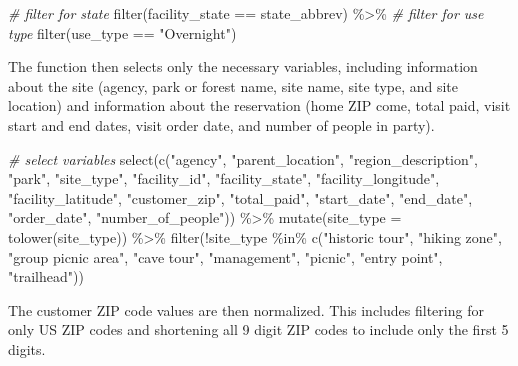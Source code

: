\documentclass[
]{book}
\newenvironment{Shaded}{\begin{snugshade}}{\end{snugshade}}
\newcommand{\AttributeTok}[1]{\textcolor[rgb]{0.77,0.63,0.00}{#1}}
\newcommand{\CommentTok}[1]{\textcolor[rgb]{0.56,0.35,0.01}{\textit{#1}}}
\newcommand{\FunctionTok}[1]{\textcolor[rgb]{0.00,0.00,0.00}{#1}}
\newcommand{\NormalTok}[1]{#1}
\newcommand{\SpecialCharTok}[1]{\textcolor[rgb]{0.00,0.00,0.00}{#1}}
\newcommand{\StringTok}[1]{\textcolor[rgb]{0.31,0.60,0.02}{#1}}
\begin{document}
\begin{Shaded}
\begin{Highlighting}[]
\CommentTok{\# filter for state}
\FunctionTok{filter}\NormalTok{(facility\_state }\SpecialCharTok{==}\NormalTok{ state\_abbrev) }\SpecialCharTok{\%\textgreater{}\%}
  \CommentTok{\# filter for use type}
  \FunctionTok{filter}\NormalTok{(use\_type }\SpecialCharTok{==} \StringTok{"Overnight"}\NormalTok{)}
\end{Highlighting}
\end{Shaded}

The function then selects only the necessary variables, including information about the site (agency, park or forest name, site name, site type, and site location) and information about the reservation (home ZIP come, total paid, visit start and end dates, visit order date, and number of people in party).

\begin{Shaded}
\begin{Highlighting}[]
\CommentTok{\# select variables}
\FunctionTok{select}\NormalTok{(}\FunctionTok{c}\NormalTok{(}\StringTok{"agency"}\NormalTok{, }\StringTok{"parent\_location"}\NormalTok{, }\StringTok{"region\_description"}\NormalTok{, }\StringTok{"park"}\NormalTok{,}
         \StringTok{"site\_type"}\NormalTok{, }\StringTok{"facility\_id"}\NormalTok{, }\StringTok{"facility\_state"}\NormalTok{, }\StringTok{"facility\_longitude"}\NormalTok{,}
         \StringTok{"facility\_latitude"}\NormalTok{, }\StringTok{"customer\_zip"}\NormalTok{, }\StringTok{"total\_paid"}\NormalTok{, }\StringTok{"start\_date"}\NormalTok{,}
         \StringTok{"end\_date"}\NormalTok{, }\StringTok{"order\_date"}\NormalTok{, }\StringTok{"number\_of\_people"}\NormalTok{)) }\SpecialCharTok{\%\textgreater{}\%}
  \FunctionTok{mutate}\NormalTok{(}\AttributeTok{site\_type =} \FunctionTok{tolower}\NormalTok{(site\_type)) }\SpecialCharTok{\%\textgreater{}\%}
  \FunctionTok{filter}\NormalTok{(}\SpecialCharTok{!}\NormalTok{site\_type }\SpecialCharTok{\%in\%} \FunctionTok{c}\NormalTok{(}\StringTok{"historic tour"}\NormalTok{, }\StringTok{"hiking zone"}\NormalTok{, }\StringTok{"group picnic area"}\NormalTok{, }\StringTok{"cave tour"}\NormalTok{,}
                           \StringTok{"management"}\NormalTok{, }\StringTok{"picnic"}\NormalTok{, }\StringTok{"entry point"}\NormalTok{, }\StringTok{"trailhead"}\NormalTok{))}
\end{Highlighting}
\end{Shaded}

The customer ZIP code values are then normalized. This includes filtering for only US ZIP codes and shortening all 9 digit ZIP codes to include only the first 5 digits.
\end{document}
